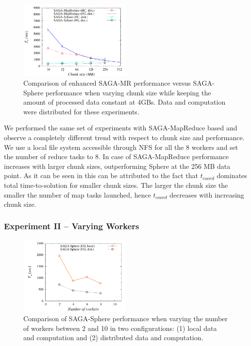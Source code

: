 \documentclass[3p,twocolumn]{elsarticle}
\begin{document}
\begin{figure}[htb!]
 \upp \upp
 \includegraphics[width=0.5\textwidth]{figures/sphere_mr_varying_chunksize.pdf}
 \upp \upp
 \caption{
   Comparison of enhanced SAGA-MR performance versus
   SAGA-Sphere performance when varying chunk size while keeping the amount
   of processed data constant at 4GBs. Data and computation were
   distributed for these experiments.
   \label{fig:sphere_mr_chunksize}
   }
\end{figure}

We performed the same set of experiments with SAGA-MapReduce based
\wc and observe a completely different trend with respect to
chunk size and performance. We use a local file system accessible
through NFS for all the 8 workers and set the number of reduce tasks
to 8.  In case of SAGA-MapReduce performance increases with larger
chunk sizes, outperforming Sphere at the 256 MB data point. As it can
be seen in  this can be attributed to the fact that
$t_{coord}$ dominates total time-to-solution for smaller chunk sizes.
The larger the chunk size the smaller the number of map tasks
launched, hence $t_{coord}$ decreases with increasing chunk size.


\subsubsection{Experiment II -- Varying Workers}

\begin{figure}[htb!]
 \includegraphics[width=0.5\textwidth]{figures/sphere_varying_workers.pdf}
 \caption{
   Comparison of SAGA-Sphere performance when varying the number of workers
   between 2 and 10 in two configurations: (1) local data and computation
   and (2) distributed data and computation.
   \label{fig:sphere_varying_workers}
   }
\end{figure}
\end{document}
